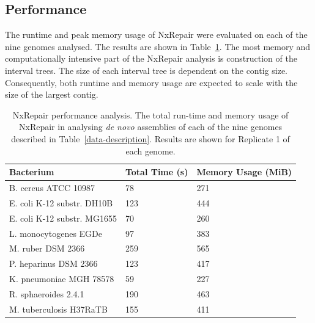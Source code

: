 \subsection{Performance}
The runtime and peak memory usage of NxRepair were evaluated on each of the nine genomes analysed. The results are shown in Table~\ref{tab:performance}. The most memory and computationally intensive part of the NxRepair analysis is construction of the interval trees. The size of each interval tree is dependent on the contig size. Consequently, both runtime and memory usage are expected to scale with the size of the largest contig. 

\begin{table}
\begin{center}
\caption{NxRepair performance analysis. The total run-time and memory usage of NxRepair in analysing \emph{de novo} assemblies of each of the nine genomes described in Table~\ref{data-description}. Results are shown for Replicate 1 of each genome. \label{tab:performance}}
\begin{tabular}{lll}
    \hline
    Bacterium & Total Time (s) & Memory Usage (MiB) \\ \hline
    B. cereus ATCC 10987 & 78 & 271 \\
    E. coli K-12 substr. DH10B & 123 & 444 \\
    E. coli K-12 substr. MG1655 & 70 & 260 \\
    L. monocytogenes EGDe & 97 & 383 \\
    M. ruber DSM 2366 & 259 & 565 \\
    P. heparinus DSM 2366 & 123 & 417 \\
    K. pneumoniae MGH 78578 & 59 & 227 \\
    R. sphaeroides 2.4.1 & 190 & 463 \\
    M. tuberculosis H37RaTB & 155 & 411 \\ 
    \hline
\end{tabular}
\end{center}
\end{table}

